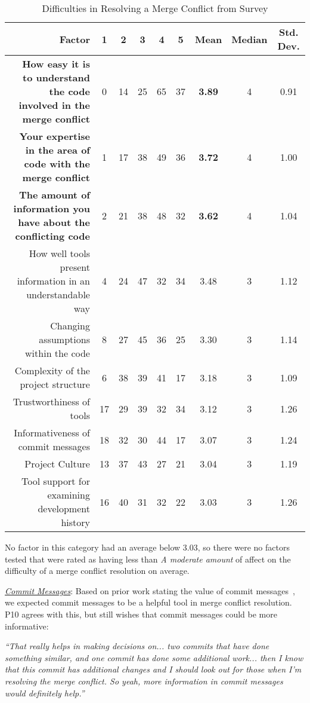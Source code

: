 \begin{table*}[!]
\renewcommand{\arraystretch}{1.3}
\caption{Difficulties in Resolving a Merge Conflict from Survey}
\label{survey_res_diffs}
\centering
\begin{tabularx}{0.9\textwidth}{r | *5{c} | *3{c}}

\toprule
	Factor & 1 & 2 & 3 & 4 & 5 & Mean & Median & Std. Dev. \\
\midrule
	\textbf{How easy it is to understand the code involved in the merge conflict} & 0 & 14 & 25 & 65 & 37 & \textbf{3.89} & 4 & 0.91\\
	\textbf{Your expertise in the area of code with the merge conflict} & 1 & 17 & 38 & 49 & 36 & \textbf{3.72} & 4 & 1.00\\
	\textbf{The amount of information you have about the conflicting code} & 2 & 21 & 38 & 48 & 32 & \textbf{3.62} & 4 & 1.04\\
	How well tools present information in an understandable way & 4 & 24 & 47 & 32 & 34 & 3.48 & 3 & 1.12\\
	Changing assumptions within the code & 8 & 27 & 45 & 36 & 25 & 3.30 & 3 & 1.14\\
	Complexity of the project structure & 6 & 38 & 39 & 41 & 17 & 3.18 & 3 & 1.09\\
	Trustworthiness of tools & 17 & 29 & 39 & 32 & 34 & 3.12 & 3 & 1.26\\
	Informativeness of commit messages & 18 & 32 & 30 & 44 & 17 & 3.07 & 3 & 1.24\\
	Project Culture & 13 & 37 & 43 & 27 & 21 & 3.04 & 3 & 1.19\\
	Tool support for examining development history & 16 & 40 & 31 & 32 & 22 & 3.03 & 3 & 1.26\\
\bottomrule
\end{tabularx}
\end{table*}

No factor in this category had an average below 3.03, so there were no factors tested that were rated as having less than \textit{A moderate amount} of affect on the difficulty of a merge conflict resolution on average.

\underline{\textit{Commit Messages}}:
Based on prior work stating the value of commit messages~\cite{yamauchi2014clustering}\cite{hindle2009automatic}\cite{cortes2014automatically}\cite{hattori2008nature}, we expected commit messages to be a helpful tool in merge conflict resolution. 
P10 agrees with this, but still wishes that commit messages could be more informative:
\begin{displayquote}
	\textit{``That really helps in making decisions on... two commits that have done something similar, and one commit has done some additional work... then I know that this commit has additional changes and I should look out for those when I'm resolving the merge conflict. So yeah, more information in commit messages would definitely help.''}
\end{displayquote}

